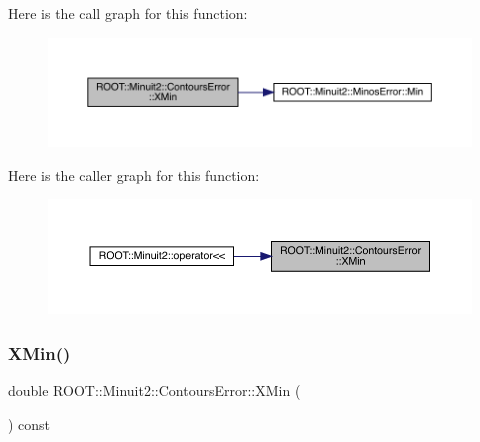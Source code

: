 Here is the call graph for this function\+:
\nopagebreak
\begin{figure}[H]
\begin{center}
\leavevmode
\includegraphics[width=350pt]{d3/de9/classROOT_1_1Minuit2_1_1ContoursError_ac0dbac1ec08765a632908c88c5f24822_cgraph}
\end{center}
\end{figure}
Here is the caller graph for this function\+:
\nopagebreak
\begin{figure}[H]
\begin{center}
\leavevmode
\includegraphics[width=350pt]{d3/de9/classROOT_1_1Minuit2_1_1ContoursError_ac0dbac1ec08765a632908c88c5f24822_icgraph}
\end{center}
\end{figure}
\mbox{\label{classROOT_1_1Minuit2_1_1ContoursError_ac0dbac1ec08765a632908c88c5f24822}} 
\subsubsection{\texorpdfstring{XMin()}{XMin()}\hspace{0.1cm}{\footnotesize\ttfamily [3/3]}}
{\footnotesize\ttfamily double R\+O\+O\+T\+::\+Minuit2\+::\+Contours\+Error\+::\+X\+Min (\begin{DoxyParamCaption}{ }\end{DoxyParamCaption}) const\hspace{0.3cm}{\ttfamily [inline]}}

